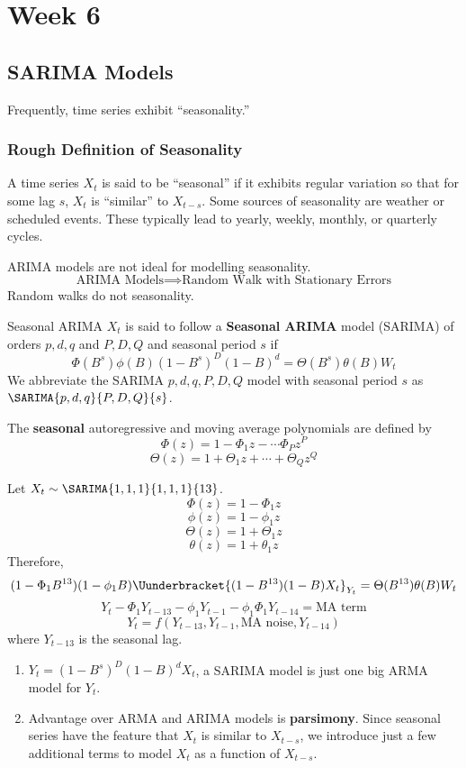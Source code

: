 \chapter{Week 6}
\section{SARIMA Models}
Frequently, time series exhibit ``seasonality.''
\subsection*{Rough Definition of Seasonality}
A time series $ X_t $ is said to be ``seasonal''
if it exhibits regular variation so that for some lag $ s $,
$ X_t $ is ``similar'' to $ X_{t-s} $.
Some sources of seasonality are weather or scheduled events.
These typically lead to yearly, weekly, monthly, or quarterly cycles.
\begin{Remark}{}{}
    ARIMA models are not ideal for modelling seasonality.
    \[ \text{ARIMA Models}\implies\text{Random Walk with Stationary Errors} \]
    Random walks do not seasonality.
\end{Remark}
\begin{Definition}{Seasonal ARIMA}{}
    $ X_t $ is said to follow a \textbf{Seasonal ARIMA} model (SARIMA)
    of orders $ p,d,q $ and $ P,D,Q $ and seasonal period $ s $
    if
    \[ \Phi(B^s)\phi(B)(1-B^s)^D(1-B)^d=\Theta(B^s)\theta(B)W_t \]
    We abbreviate the SARIMA $ p,d,q,P,D,Q $ model with seasonal
    period $ s $ as $ \SARIMA{p,d,q}{P,D,Q}{s} $.
\end{Definition}
\begin{Definition}{}{}
    The \textbf{seasonal} autoregressive and moving average polynomials are
    defined by
    \[ \Phi(z)=1-\Phi_1 z-\cdots \Phi_P z^P \]
    \[ \Theta(z)=1+\Theta_1 z+\cdots+\Theta_Q z^Q \]
\end{Definition}
\begin{Example}{}{}
    Let $ X_t \sim \SARIMA{1,1,1}{1,1,1}{13} $.
    \[ \Phi(z)=1-\Phi_1 z \]
    \[ \phi(z)=1-\phi_1 z \]
    \[ \Theta(z)=1+\Theta_1 z \]
    \[ \theta(z)=1+\theta_1 z \]
    Therefore,
    \[ (1-\Phi_1 B^{13})(1-\phi_1 B)\Uunderbracket{(1-B^{13})(1-B)X_t}_{Y_t}=\Theta(B^{13})\theta(B)W_t \]
    \[ Y_t-\Phi_1 Y_{t-13}-\phi_1 Y_{t-1}-\phi_1 \Phi_1 Y_{t-14}=\text{MA term} \]
    \[ Y_t=f(Y_{t-13},Y_{t-1},\text{MA noise}, Y_{t-14}) \]
    where $ Y_{t-13} $ is the seasonal lag.
\end{Example}
\begin{Remark}{}{}
    \begin{enumerate}[(1)]
        \item $ Y_t=(1-B^s)^D(1-B)^d X_t $, a SARIMA model is just one big ARMA
              model for $ Y_t $.
        \item Advantage over ARMA and ARIMA models is \textbf{parsimony}.
              Since seasonal series have the feature that $ X_t $ is similar to $ X_{t-s} $,
              we introduce just a few additional terms to model $ X_t $ as a function of
              $ X_{t-s} $.
    \end{enumerate}
\end{Remark}
